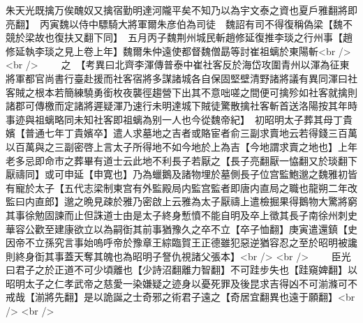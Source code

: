 朱天光既擒万俟醜奴又擒宿勤明達河隴平矣不知乃以為宇文泰之資也夏戶雅翻將即亮翻】　丙寅魏以侍中驃騎大將軍爾朱彦伯為司徒　魏詔有司不得復稱偽梁【魏不競於梁故也復扶又翻下同】　五月丙子魏荆州城民斬趙修延復推李琰之行州事【趙修延執李琰之見上卷上年】魏爾朱仲遠使都督魏僧勗等討崔祖螭於東陽斬<br />
<br />
　　之　【考異曰北齊李渾傳普泰中崔社客反於海岱攻圍青州以渾為征東將軍都官尚書行臺赴援而社客宿將多謀諸城各自保固堅壁清野諸將議有異同渾曰社客賊之根本若簡練驍勇銜枚夜襲徑趨營下出其不意咄嗟之間便可擒殄如社客就擒則諸郡可傳檄而定諸將遲疑渾乃速行未明達城下賊徒驚散擒社客斬首送洛陽按其年時事迹與祖螭略同未知社客即祖螭為别一人也今從魏帝紀】　初昭明太子葬其母丁貴嬪【普通七年丁貴嬪卒】遣人求墓地之吉者或賂宦者俞三副求賣地云若得錢三百萬以百萬與之三副密啓上言太子所得地不如今地於上為吉【今地謂求賣之地也】上年老多忌即命市之葬畢有道士云此地不利長子若厭之【長子亮翻厭一恊翻又於琰翻下厭禱同】或可申延【申寛也】乃為蠟鵝及諸物埋於墓側長子位宫監鮑邈之魏雅初皆有寵於太子【五代志梁制東宫有外監殿局内監宫監者即唐内直局之職也龍朔二年改監曰内直郎】邈之晩見疎於雅乃密啟上云雅為太子厭禱上遣檢掘果得鵝物大驚將窮其事徐勉固諫而止但誅道士由是太子終身慙憤不能自明及卒上徵其長子南徐州刺史華容公歡至建康欲立以為嗣衘其前事猶豫久之卒不立【卒子恤翻】庚寅遣還鎮【史因帝不立孫究言事始嗚呼帝於豫章王綜臨賀王正德雖犯惡逆猶容忍之至於昭明被讒則終身衘其事蓋天奪其魄也為昭明子詧仇視諸父張本】<br />
<br />
　　臣光曰君子之於正道不可少頃離也【少詩沼翻離力智翻】不可跬步失也【跬窺婢翻】以昭明太子之仁孝武帝之慈愛一染嫌疑之迹身以憂死罪及後昆求吉得凶不可湔滌可不戒哉【湔將先翻】是以詭誕之士奇邪之術君子遠之【奇居宜翻異也遠于願翻】<br />
<br />
